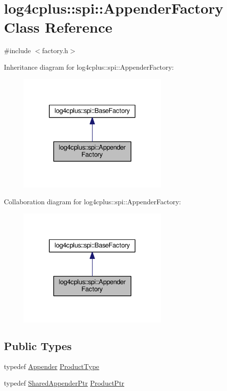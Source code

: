 \hypertarget{classlog4cplus_1_1spi_1_1AppenderFactory}{\section{log4cplus\-:\-:spi\-:\-:Appender\-Factory Class Reference}
\label{classlog4cplus_1_1spi_1_1AppenderFactory}
}


{\ttfamily \#include $<$factory.\-h$>$}



Inheritance diagram for log4cplus\-:\-:spi\-:\-:Appender\-Factory\-:
\nopagebreak
\begin{figure}[H]
\begin{center}
\leavevmode
\includegraphics[width=212pt]{classlog4cplus_1_1spi_1_1AppenderFactory__inherit__graph}
\end{center}
\end{figure}


Collaboration diagram for log4cplus\-:\-:spi\-:\-:Appender\-Factory\-:
\nopagebreak
\begin{figure}[H]
\begin{center}
\leavevmode
\includegraphics[width=212pt]{classlog4cplus_1_1spi_1_1AppenderFactory__coll__graph}
\end{center}
\end{figure}
\subsection*{Public Types}
\begin{DoxyCompactItemize}
\item 
typedef \hyperlink{classlog4cplus_1_1Appender}{Appender} \hyperlink{classlog4cplus_1_1spi_1_1AppenderFactory_af20a9aa3cc06268597c1e91bc63020fd}{Product\-Type}
\item 
typedef \hyperlink{namespacelog4cplus_a12d841b842c72396be9219ce67a0c215}{Shared\-Appender\-Ptr} \hyperlink{classlog4cplus_1_1spi_1_1AppenderFactory_a05a326890cbe23183a34c07df4f81ff2}{Product\-Ptr}
\end{DoxyCompactItemize}
